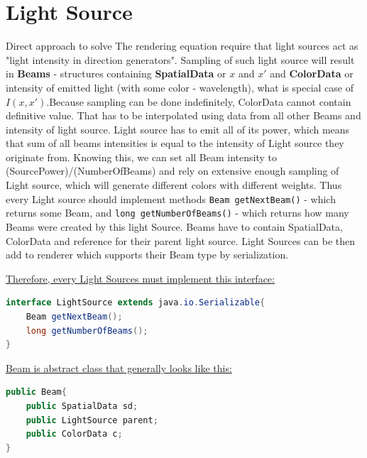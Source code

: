 \documentclass[12pt, letterpaper]{article}
\begin{document}
\section{Light Source}
Direct approach to solve The rendering equation require that light sources act as "light intensity in direction generators". Sampling of such light source will result in \textbf{Beams} - structures containing \textbf{SpatialData} or $x$ and $x'$ and \textbf{ColorData} or intensity of emitted light (with some color - wavelength), what is special case of $I(x,x')$.Because sampling can be done indefinitely, ColorData cannot contain definitive value. That has to be interpolated using data from all other Beams and intensity of light source. Light source has to emit all of its power, which means that sum of all beams intensities is equal to the intensity of Light source they originate from. Knowing this, we can set all Beam intensity to (SourcePower)/(NumberOfBeams)
and rely on extensive enough sampling of Light source, which  will generate different colors with different weights. Thus every Light source should implement methods \verb|Beam getNextBeam()| - which returns some Beam, and \verb|long getNumberOfBeams()| - which returns how many Beams were created by this light Source. Beams have to contain SpatialData, ColorData and reference for their parent light source. Light Sources can be then add to renderer which supports their Beam type by serialization.

\underline{Therefore, every Light Sources must implement this interface:}
\begin{lstlisting}[language=Java]
interface LightSource extends java.io.Serializable{
	Beam getNextBeam();
	long getNumberOfBeams();
}
\end{lstlisting}

\underline{Beam is abstract class that generally looks like this:}
\begin{lstlisting}[language=Java]
public Beam{
	public SpatialData sd;
	public LightSource parent;
	public ColorData c;
}
\end{lstlisting}

\end{document}
